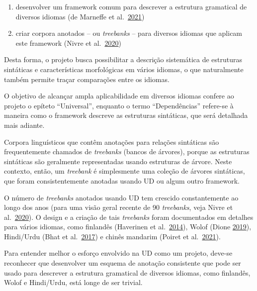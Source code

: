 \documentclass[
  brazilian,
]{article}
\providecommand{\tightlist}{%
  \setlength{\itemsep}{0pt}\setlength{\parskip}{0pt}}
\begin{document}
\begin{enumerate}
\def\labelenumi{\arabic{enumi}.}
\tightlist
\item
  desenvolver um framework comum para descrever a estrutura gramatical
  de diversos idiomas (de Marneffe et
  al.~\href{https://doi.org/10.1162/coli_a_00402}{2021})
\item
  criar corpora anotados -- ou \emph{treebanks} -- para diversos idiomas
  que aplicam este framework (Nivre et
  al.~\href{https://aclanthology.org/2020.lrec-1.497/}{2020})
\end{enumerate}

Desta forma, o projeto busca possibilitar a descrição sistemática de
estruturas sintáticas e características morfológicas em vários idiomas,
o que naturalmente também permite traçar comparações entre os idiomas.

O objetivo de alcançar ampla aplicabilidade em diversos idiomas confere
ao projeto o epíteto ``Universal'', enquanto o termo ``Dependências''
refere-se à maneira como o framework descreve as estruturas sintáticas,
que será detalhada mais adiante.

Corpora linguísticos que contêm anotações para relações sintáticas são
frequentemente chamados de \emph{treebanks} (bancos de árvores), porque
as estruturas sintáticas são geralmente representadas usando estruturas
de árvore. Neste contexto, então, um \emph{treebank} é simplesmente uma
coleção de árvores sintáticas, que foram consistentemente anotadas
usando UD ou algum outro framework.

O número de \emph{treebanks} anotados usando UD tem crescido
constantemente ao longo dos anos (para uma visão geral recente de 90
\emph{treebanks}, veja Nivre et
al.~\href{https://aclanthology.org/2020.lrec-1.497/}{2020}). O design e
a criação de tais \emph{treebanks} foram documentados em detalhes para
vários idiomas, como finlandês (Haverinen et
al.~\href{https://dx.doi.org/10.1007/s10579-013-9244-1}{2014}), Wolof
(Dione \href{https://aclanthology.org/W19-8003/}{2019}), Hindi/Urdu
(Bhat et
al.~\href{https:///dx.doi.org/10.1007/978-94-024-0881-2_24}{2017}) e
chinês mandarim (Poiret et
al.~\href{https:///dx.doi.org/10.1007/s10579-021-09564-2}{2021}).

Para entender melhor o esforço envolvido na UD como um projeto, deve-se
reconhecer que desenvolver um esquema de anotação consistente que pode
ser usado para descrever a estrutura gramatical de diversos idiomas,
como finlandês, Wolof e Hindi/Urdu, está longe de ser trivial.
\end{document}
